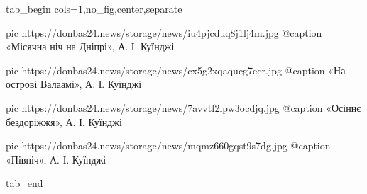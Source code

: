  
 
 
 
 


\ifcmt
  tab_begin cols=1,no_fig,center,separate

     pic https://donbas24.news/storage/news/iu4pjcduq8j1lj4m.jpg
		 @caption «Місячна ніч на Дніпрі», А. І. Куїнджі

		 pic https://donbas24.news/storage/news/cx5g2xqaqucg7ecr.jpg
		 @caption «На острові Валаамі», А. І. Куїнджі

		 pic https://donbas24.news/storage/news/7avvtf2lpw3ocdjq.jpg
		 @caption «Осіннє бездоріжжя», А. І. Куїнджі

		 pic https://donbas24.news/storage/news/mqmz660gqst9s7dg.jpg
		 @caption «Північ», А. І. Куїнджі

  tab_end
\fi
